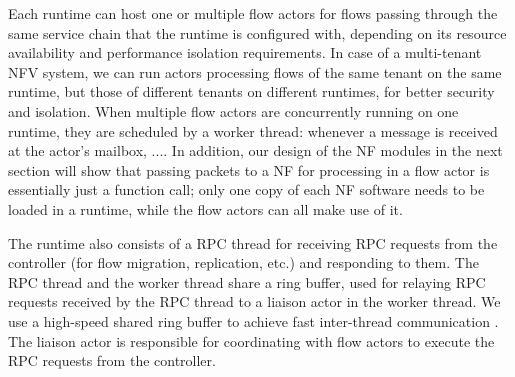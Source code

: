 Each runtime can host one or multiple flow actors for flows passing through the same service chain that the runtime is configured with, depending on its resource availability and performance isolation requirements. In case of a multi-tenant NFV system, we can run actors processing flows of the same tenant on the same runtime, but those of different tenants on different runtimes, for better security and isolation. When multiple flow actors are concurrently running on one runtime, they are scheduled by a worker thread:  whenever a message is received at the actor's mailbox, .... In addition, our design of the NF modules in the next section will show that passing packets to a NF for processing in a flow actor is essentially just a function call; only one copy of each NF software needs to be loaded in a runtime, while the flow actors can all make use of it. %



The runtime also consists of a RPC thread for receiving RPC requests from the controller (for flow migration, replication, etc.) and responding to them. The RPC thread and the worker thread share a ring buffer, used for relaying RPC requests received by the RPC thread to a liaison actor in the worker thread. We use a high-speed shared ring buffer to achieve fast inter-thread communication . The liaison actor is responsible for coordinating with flow actors to execute the RPC requests from the controller. %





